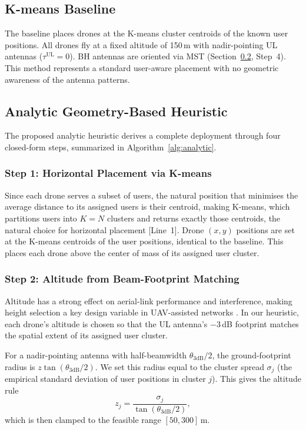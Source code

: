 \documentclass[conference]{IEEEtran}
\begin{document}
\subsection{K-means Baseline}

The baseline places drones at the K-means cluster centroids of the known user positions.
All drones fly at a fixed altitude of 150\,m with nadir-pointing UL antennas ($\tau^{\mathrm{UL}} = 0$).
BH antennas are oriented via MST (Section~\ref{sec:analytic}, Step~4).
This method represents a standard user-aware placement with no geometric awareness of the antenna patterns.

\subsection{Analytic Geometry-Based Heuristic}
\label{sec:analytic}

The proposed analytic heuristic derives a complete deployment through four closed-form steps, summarized in Algorithm~\ref{alg:analytic}.

\subsubsection{Step 1: Horizontal Placement via K-means}
Since each drone serves a subset of users, the natural position that minimises the average distance to its assigned users is their centroid, making K-means, which partitions users into $K{=}N$ clusters and returns exactly those centroids, the natural choice for horizontal placement [Line~1].
Drone $(x, y)$ positions are set at the K-means centroids of the user positions, identical to the baseline.
This places each drone above the center of mass of its assigned user cluster.

\subsubsection{Step 2: Altitude from Beam-Footprint Matching}
\label{sec:altitude}

Altitude has a strong effect on aerial-link performance and interference, making height selection a key design variable in UAV-assisted networks \cite{zhou2019}. In our heuristic, each drone's altitude is chosen so that the UL antenna's $-3$\,dB footprint matches the spatial extent of its assigned user cluster.

For a nadir-pointing antenna with half-beamwidth $\theta_{3\mathrm{dB}}/2$, the ground-footprint radius is $z \tan(\theta_{3\mathrm{dB}}/2).$
We set this radius equal to the cluster spread $\sigma_j$ (the empirical standard deviation of user positions in cluster $j$). This gives the altitude rule
\begin{equation}
\label{eq:altitude}
z_j = \frac{\sigma_j}{\tan(\theta_{3\mathrm{dB}}/2)},
\end{equation}
which is then clamped to the feasible range $[50, 300]$\,m.
\end{document}
